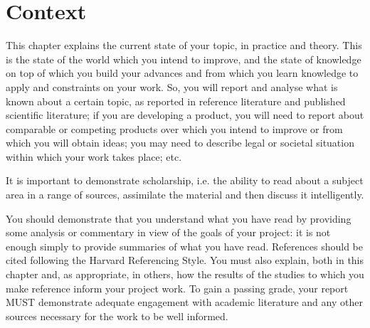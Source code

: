 
\chapter{Context}

\label{Context} 


This chapter explains the current state of your topic, in practice and theory. This is the state of the world which you intend to improve, and the state of knowledge on top of which you build your advances and from which you learn knowledge to apply and constraints on your work. So, you will report and analyse what is known about a certain topic, as reported in reference literature and published scientific literature; if you are developing a product, you will need to report about comparable or competing products over which you intend to improve or from which you will obtain ideas; you may need to describe legal or societal situation within which your work takes place; etc.  
  
It is important to demonstrate scholarship, i.e. the ability to read about a subject area in a range of sources, assimilate the material and then discuss it intelligently.  
  
You should demonstrate that you understand what you have read by providing some analysis or commentary in view of the goals of your project: it is not enough simply to provide summaries of what you have read. References should be cited following the Harvard Referencing Style. You must also explain, both in this chapter and, as appropriate, in others, how the results of the studies to which you make reference inform your project work. To gain a passing grade, your report MUST demonstrate adequate engagement with academic literature and any other sources necessary for the work to be well informed.  




